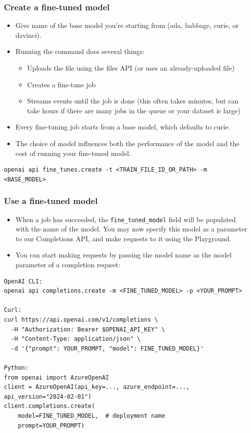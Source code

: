 \begin{frame}[fragile]\frametitle{Create a fine-tuned model}

\begin{itemize}
\item Give name of the base model you're starting from (ada, babbage, curie, or davinci).
\item Running the command does several things:
	\begin{itemize}
	\item Uploads the file using the files API (or uses an already-uploaded file)
	\item Creates a fine-tune job
	\item Streams events until the job is done (this often takes minutes, but can take hours if there are many jobs in the queue or your dataset is large)
	\end{itemize}	 
\item Every fine-tuning job starts from a base model, which defaults to curie. 
\item The choice of model influences both the performance of the model and the cost of running your fine-tuned model.
\end{itemize}	 

\begin{lstlisting}
openai api fine_tunes.create -t <TRAIN_FILE_ID_OR_PATH> -m <BASE_MODEL>
\end{lstlisting}	

\end{frame}


\begin{frame}[fragile]\frametitle{Use a fine-tuned model}

\begin{itemize}
\item When a job has succeeded, the \lstinline|fine_tuned_model| field will be populated with the name of the model. You may now specify this model as a parameter to our Completions API, and make requests to it using the Playground.
\item You can start making requests by passing the model name as the model parameter of a completion request:
\end{itemize}	 

\begin{lstlisting}
OpenAI CLI:
openai api completions.create -m <FINE_TUNED_MODEL> -p <YOUR_PROMPT>

Curl:
curl https://api.openai.com/v1/completions \
  -H "Authorization: Bearer $OPENAI_API_KEY" \
  -H "Content-Type: application/json" \
  -d '{"prompt": YOUR_PROMPT, "model": FINE_TUNED_MODEL}'

Python:
from openai import AzureOpenAI
client = AzureOpenAI(api_key=..., azure_endpoint=..., api_version="2024-02-01")
client.completions.create(
    model=FINE_TUNED_MODEL,  # deployment name
    prompt=YOUR_PROMPT)
		
\end{lstlisting}	
		
\end{frame}

